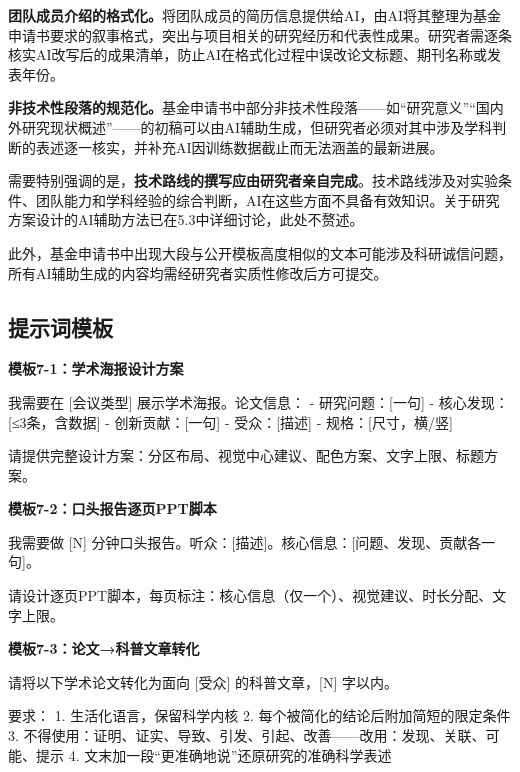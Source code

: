 \textbf{团队成员介绍的格式化。}将团队成员的简历信息提供给AI，由AI将其整理为基金申请书要求的叙事格式，突出与项目相关的研究经历和代表性成果。研究者需逐条核实AI改写后的成果清单，防止AI在格式化过程中误改论文标题、期刊名称或发表年份。

\textbf{非技术性段落的规范化。}基金申请书中部分非技术性段落——如``研究意义''``国内外研究现状概述''——的初稿可以由AI辅助生成，但研究者必须对其中涉及学科判断的表述逐一核实，并补充AI因训练数据截止而无法涵盖的最新进展。

需要特别强调的是，\textbf{技术路线的撰写应由研究者亲自完成}。技术路线涉及对实验条件、团队能力和学科经验的综合判断，AI在这些方面不具备有效知识。关于研究方案设计的AI辅助方法已在5.3中详细讨论，此处不赘述。

此外，基金申请书中出现大段与公开模板高度相似的文本可能涉及科研诚信问题，所有AI辅助生成的内容均需经研究者实质性修改后方可提交。

\subsection*{提示词模板}

\textbf{模板7-1：学术海报设计方案}

\begin{tcolorbox}[promptbox]
我需要在 [会议类型] 展示学术海报。论文信息：
- 研究问题：[一句]  - 核心发现：[≤3条，含数据]
- 创新贡献：[一句]  - 受众：[描述]  - 规格：[尺寸，横/竖]

请提供完整设计方案：分区布局、视觉中心建议、配色方案、文字上限、标题方案。
\end{tcolorbox}

\textbf{模板7-2：口头报告逐页PPT脚本}

\begin{tcolorbox}[promptbox]
我需要做 [N] 分钟口头报告。听众：[描述]。核心信息：[问题、发现、贡献各一句]。

请设计逐页PPT脚本，每页标注：核心信息（仅一个）、视觉建议、时长分配、文字上限。
\end{tcolorbox}

\textbf{模板7-3：论文→科普文章转化}

\begin{tcolorbox}[promptbox]
请将以下学术论文转化为面向 [受众] 的科普文章，[N] 字以内。

要求：
1. 生活化语言，保留科学内核
2. 每个被简化的结论后附加简短的限定条件
3. 不得使用：证明、证实、导致、引发、引起、改善——改用：发现、关联、可能、提示
4. 文末加一段``更准确地说''还原研究的准确科学表述
\end{tcolorbox}

